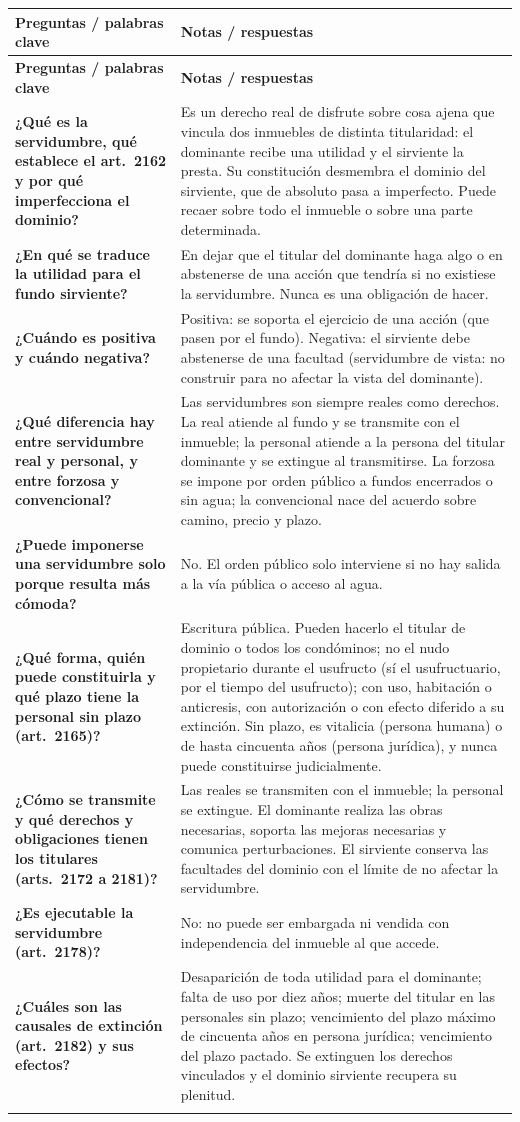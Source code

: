 \documentclass[12pt,oneside]{book}
\makeatletter
\renewcommand{\arraystretch}{1.25}
\newcommand{\cq}[2]{\textbf{#1} & #2 \\[0.45em]}
\newcommand{\cornell}[3]{%
\par\bigskip\noindent{\large\bfseries Cuadro Cornell: #1}\par\nopagebreak\smallskip
\begingroup
\small
\renewcommand{\arraystretch}{1.15}
\begin{longtable}{@{}>{\raggedright\arraybackslash}p{0.26\textwidth}>{\raggedright\arraybackslash}p{0.66\textwidth}@{}}
\toprule
\textbf{Preguntas / palabras clave} & \textbf{Notas / respuestas} \\
\midrule
\endfirsthead
\toprule
\textbf{Preguntas / palabras clave} & \textbf{Notas / respuestas} \\
\midrule
\endhead
#2
\midrule
\multicolumn{2}{@{}p{\dimexpr0.92\textwidth+2\tabcolsep\relax}@{}}{\vspace{0.2em}\textbf{Resumen.} #3\vspace{0.2em}} \\
\bottomrule
\end{longtable}
\endgroup
}
\makeatother
\begin{document}
\cornell{servidumbre}{
\cq{¿Qué es la servidumbre, qué establece el art.~2162 y por qué imperfecciona el dominio?}{Es un derecho real de disfrute sobre cosa ajena que vincula dos inmuebles de distinta titularidad: el dominante recibe una utilidad y el sirviente la presta. Su constitución desmembra el dominio del sirviente, que de absoluto pasa a imperfecto. Puede recaer sobre todo el inmueble o sobre una parte determinada.}
\cq{¿En qué se traduce la utilidad para el fundo sirviente?}{En dejar que el titular del dominante haga algo o en abstenerse de una acción que tendría si no existiese la servidumbre. Nunca es una obligación de hacer.}
\cq{¿Cuándo es positiva y cuándo negativa?}{Positiva: se soporta el ejercicio de una acción (que pasen por el fundo). Negativa: el sirviente debe abstenerse de una facultad (servidumbre de vista: no construir para no afectar la vista del dominante).}
\cq{¿Qué diferencia hay entre servidumbre real y personal, y entre forzosa y convencional?}{Las servidumbres son siempre reales como derechos. La real atiende al fundo y se transmite con el inmueble; la personal atiende a la persona del titular dominante y se extingue al transmitirse. La forzosa se impone por orden público a fundos encerrados o sin agua; la convencional nace del acuerdo sobre camino, precio y plazo.}
\cq{¿Puede imponerse una servidumbre solo porque resulta más cómoda?}{No. El orden público solo interviene si no hay salida a la vía pública o acceso al agua.}
\cq{¿Qué forma, quién puede constituirla y qué plazo tiene la personal sin plazo (art.~2165)?}{Escritura pública. Pueden hacerlo el titular de dominio o todos los condóminos; no el nudo propietario durante el usufructo (sí el usufructuario, por el tiempo del usufructo); con uso, habitación o anticresis, con autorización o con efecto diferido a su extinción. Sin plazo, es vitalicia (persona humana) o de hasta cincuenta años (persona jurídica), y nunca puede constituirse judicialmente.}
\cq{¿Cómo se transmite y qué derechos y obligaciones tienen los titulares (arts.~2172 a 2181)?}{Las reales se transmiten con el inmueble; la personal se extingue. El dominante realiza las obras necesarias, soporta las mejoras necesarias y comunica perturbaciones. El sirviente conserva las facultades del dominio con el límite de no afectar la servidumbre.}
\cq{¿Es ejecutable la servidumbre (art.~2178)?}{No: no puede ser embargada ni vendida con independencia del inmueble al que accede.}
\cq{¿Cuáles son las causales de extinción (art.~2182) y sus efectos?}{Desaparición de toda utilidad para el dominante; falta de uso por diez años; muerte del titular en las personales sin plazo; vencimiento del plazo máximo de cincuenta años en persona jurídica; vencimiento del plazo pactado. Se extinguen los derechos vinculados y el dominio sirviente recupera su plenitud.}
}{La servidumbre vincula dos fundos de distinta titularidad: el dominante recibe una utilidad y el sirviente la presta mediante un permitir o abstenerse, nunca un hacer. Se clasifica en positivas y negativas, reales y personales, forzosas y convencionales. Se constituye por escritura pública, la transmiten con el inmueble las reales y se extingue la personal, es inembargable con independencia del fundo (art.~2178) y se extingue por las causales del art.~2182, tras lo cual el dominio sirviente recupera su plenitud.}
\end{document}
